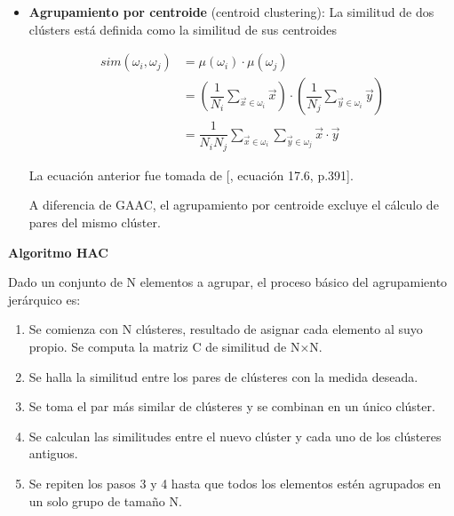 \documentclass{llncs}
\begin{document}
\begin{itemize}
	La ecuaci\'on anterior fue tomada de [\cite{B1}, ecuaci\'on 17.1, p.389].
	
	Esta evalúa la calidad de un clúster basada en todas las similitudes entre documentos, evitando así castigar valores extremos como en los criterios de enlace único y enlace completo, que establecen la similitud del cl\'uster con la similitud de un solo par de documentos.
	
	\vspace{1em}
	\item \textbf{Agrupamiento por centroide} (centroid clustering): La similitud de dos cl\'usters est\'a definida como la similitud de sus centroides

		\begin{align}
			sim(\omega_{i}, \omega_{j}) &= \mu(\omega_{i})\cdot\mu(\omega_{j}) \nonumber\\
			&= \left(\dfrac{1}{N_{i}}\sum_{\overrightarrow{x} \in \omega_{i}}\overrightarrow{x}\right) \cdot \left(\dfrac{1}{N_{j}}\sum_{\overrightarrow{y} \in \omega_{i}}\overrightarrow{y}\right) \nonumber\\
			& = \dfrac{1}{N_{i}N_{j}} \sum_{\overrightarrow{x} \in \omega_{i}}\sum_{\overrightarrow{y} \in \omega_{j}}\overrightarrow{x}\cdot\overrightarrow{y} \nonumber
		\end{align}
	
	La ecuaci\'on anterior fue tomada de  [\cite{B1}, ecuaci\'on 17.6, p.391].
	
	A diferencia de GAAC, el agrupamiento por centroide excluye el c\'alculo de pares del mismo cl\'uster.
\end{itemize}

\vspace{1em}
\textbf{Algoritmo HAC}

Dado un conjunto de N elementos a agrupar, el proceso básico del agrupamiento jerárquico es:
\begin{enumerate}
	\item Se comienza con N cl\'usteres, resultado de asignar cada elemento al suyo propio. Se computa la matriz C de similitud de N×N.
	
	\item Se halla la similitud entre los pares de cl\'usteres con la medida deseada.
	
	\item Se toma el par más similar de clústeres y se combinan en un único clúster.
	
	\item Se calculan las similitudes entre el nuevo clúster y cada uno de los cl\'usteres antiguos.
	
	\item Se repiten los pasos 3 y 4 hasta que todos los elementos estén agrupados en un solo grupo de tamaño N.
\end{enumerate}
\end{document}
